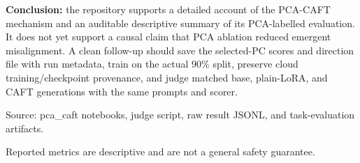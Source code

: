 \documentclass[11pt]{article}
\begin{document}
\begin{positivebox}
\textbf{Conclusion:} the repository supports a detailed account of the PCA-CAFT mechanism and an auditable descriptive summary of its PCA-labelled evaluation. It does not yet support a causal claim that PCA ablation reduced emergent misalignment. A clean follow-up should save the selected-PC scores and direction file with run metadata, train on the actual 90\% split, preserve cloud training/checkpoint provenance, and judge matched base, plain-LoRA, and CAFT generations with the same prompts and scorer.
\end{positivebox}

\vfill
\begin{center}
{\sffamily\small\color{muted}Source: pca\_caft notebooks, judge script, raw result JSONL, and task-evaluation artifacts.}\par
{\sffamily\small\color{muted}Reported metrics are descriptive and are not a general safety guarantee.}
\end{center}
\end{document}
